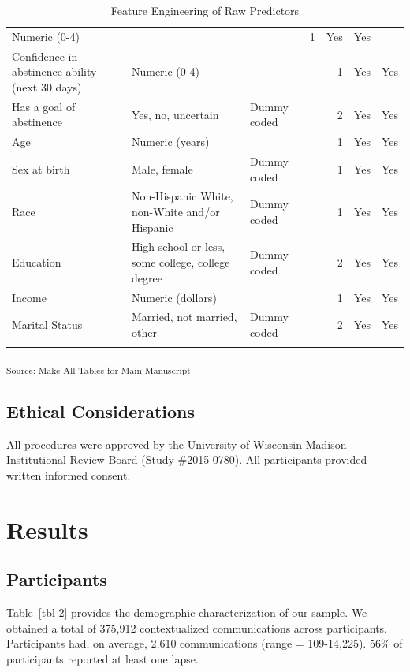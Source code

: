 \documentclass[
  letterpaper,
  DIV=11,
  numbers=noendperiod]{scrartcl}
\begin{document}
\begin{longtable}[]{@{}llllrll@{}}
Numeric (0-4) & & & 1 & Yes & Yes \\
Confidence in abstinence ability (next 30 days) & Numeric (0-4) & & & 1
& Yes & Yes \\
Has a goal of abstinence & Yes, no, uncertain & Dummy coded & & 2 & Yes
& Yes \\
Age & Numeric (years) & & & 1 & Yes & Yes \\
Sex at birth & Male, female & Dummy coded & & 1 & Yes & Yes \\
Race & Non-Hispanic White, non-White and/or Hispanic & Dummy coded & & 1
& Yes & Yes \\
Education & High school or less, some college, college degree & Dummy
coded & & 2 & Yes & Yes \\
Income & Numeric (dollars) & & & 1 & Yes & Yes \\
Marital Status & Married, not married, other & Dummy coded & & 2 & Yes &
Yes \\


\caption{\label{tbl-1}Feature Engineering of Raw Predictors}

\tabularnewline
\end{longtable}

\textsubscript{Source:
\href{https://jjcurtin.github.io/study_messages/notebooks/mak_tables-preview.html\#cell-tbl-1}{Make
All Tables for Main Manuscript}}

\subsection{Ethical Considerations}\label{ethical-considerations}

All procedures were approved by the University of Wisconsin-Madison
Institutional Review Board (Study \#2015-0780). All participants
provided written informed consent.

\section{Results}\label{results}

\subsection{Participants}\label{participants}

Table~\ref{tbl-2} provides the demographic characterization of our
sample. We obtained a total of 375,912 contextualized communications
across participants. Participants had, on average, 2,610 communications
(range = 109-14,225). 56\% of participants reported at least one lapse.
\end{document}
